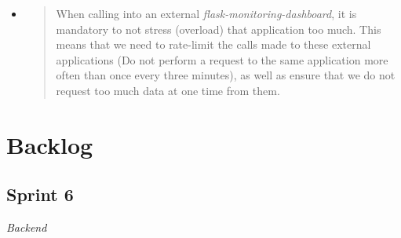 \begin{itemize}
  \begin{itemize}
  \item
    \begin{quote}
    When calling into an external \emph{flask-monitoring-dashboard}, it
    is mandatory to not stress (overload) that application too much.
    This means that we need to rate-limit the calls made to these
    external applications (Do not perform a request to the same
    application more often than once every three minutes), as well as
    ensure that we do not request too much data at one time from them.
    \end{quote}
  \end{itemize}
\end{itemize}

\hypertarget{backlog}{%
\section{Backlog}\label{backlog}}

\hypertarget{sprint-6}{%
\subsection{Sprint 6}\label{sprint-6}}

\emph{Backend}

